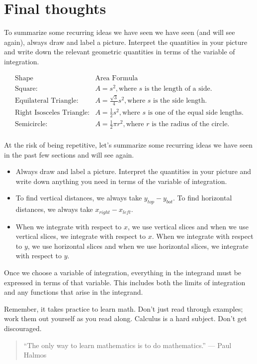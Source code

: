\documentclass{ximera}
\begin{document}
\section{Final thoughts}
To summarize some recurring ideas we have seen we have seen (and will see again), always draw and label a picture.  Interpret the quantities in your picture and write down the relevant geometric quantities in terms of the variable of integration.

\[
\begin{array}{ll}
\textrm{Shape} & \textrm{Area Formula} \\ [2ex]
\textrm{Square:} & A=s^2, \textrm{where } s \textrm{ is the length of a side.} \\  [2ex]
\textrm{Equilateral Triangle:} & A=\frac{\sqrt{3}}{4} s^2, \textrm{where } s \textrm{ is the side length.} \\  [2ex]
\textrm{Right Isosceles Triangle:} & A=\frac{1}{2} s^2, \textrm{where } s \textrm{ is one of the equal side lengths.} \\  [2ex]
\textrm{Semicircle:} & A=\frac{1}{2} \pi r^2, \textrm{where } r \textrm{ is the radius of the circle.} \\ [2ex]
\end{array}
\]



At the risk of being repetitive, let's summarize some recurring ideas we have seen in the past few sections and will see again.  

\begin{itemize}
\item Always draw and label a picture.  Interpret the quantities in your picture and write down anything you need in terms of the variable of integration.

\item To find vertical distances, we always take $y_{top} - y_{bot}$.  To find horizontal distances, we always take $x_{right}-x_{left}$.

\item When we integrate with respect to $x$, we use vertical slices and when we use vertical slices, we integrate with respect to $x$. When we integrate with respect to $y$, we use horizontal slices and when we use horizontal slices, we integrate with respect to $y$.
\end{itemize}

\begin{fact}
Once we choose a variable of integration, everything in the integrand must be expressed in terms of that variable.  This includes both the limits of integration and any functions that arise in the integrand.
\end{fact}

Remember, it takes practice to learn math.  Don't just read through examples; work them out yourself as you read along. Calculus is a hard subject. Don't get discouraged.


\begin{quote}
``The only way to learn mathematics is to do mathematics.'' --- Paul Halmos
\end{quote}
\end{document}
